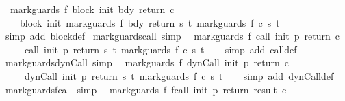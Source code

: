 \begin{isabellebody}
\ \ {\isachardoublequoteopen}mark{\isacharunderscore}guards\ f\ {\isacharparenleft}block\ init\ bdy\ return\ c{\isacharparenright}\ {\isacharequal}\isanewline
\ \ \ \ block\ init\ {\isacharparenleft}mark{\isacharunderscore}guards\ f\ bdy{\isacharparenright}\ return\ {\isacharparenleft}{\isasymlambda}s\ t{\isachardot}\ mark{\isacharunderscore}guards\ f\ {\isacharparenleft}c\ s\ t{\isacharparenright}{\isacharparenright}{\isachardoublequoteclose}\isanewline
%
\isadelimproof
\ \ %
\endisadelimproof
%
\isatagproof
{}\isamarkupfalse%
\ {\isacharparenleft}simp\ add{\isacharcolon}\ block{\isacharunderscore}def{\isacharparenright}%
\endisatagproof
{\isafoldproof}%
%
\isadelimproof
\isanewline
%
\endisadelimproof
\isanewline
{}\isamarkupfalse%
\ mark{\isacharunderscore}guards{\isacharunderscore}call\ {\isacharbrackleft}simp{\isacharbrackright}{\isacharcolon}\isanewline
\ \ {\isachardoublequoteopen}mark{\isacharunderscore}guards\ f\ {\isacharparenleft}call\ init\ p\ return\ c{\isacharparenright}\ {\isacharequal}\isanewline
\ \ \ \ \ call\ init\ p\ return\ {\isacharparenleft}{\isasymlambda}s\ t{\isachardot}\ mark{\isacharunderscore}guards\ f\ {\isacharparenleft}c\ s\ t{\isacharparenright}{\isacharparenright}{\isachardoublequoteclose}\isanewline
%
\isadelimproof
\ \ %
\endisadelimproof
%
\isatagproof
{}\isamarkupfalse%
\ {\isacharparenleft}simp\ add{\isacharcolon}\ call{\isacharunderscore}def{\isacharparenright}%
\endisatagproof
{\isafoldproof}%
%
\isadelimproof
\isanewline
%
\endisadelimproof
\isanewline
{}\isamarkupfalse%
\ mark{\isacharunderscore}guards{\isacharunderscore}dynCall\ {\isacharbrackleft}simp{\isacharbrackright}{\isacharcolon}\isanewline
\ \ {\isachardoublequoteopen}mark{\isacharunderscore}guards\ f\ {\isacharparenleft}dynCall\ init\ p\ return\ c{\isacharparenright}\ {\isacharequal}\isanewline
\ \ \ \ \ dynCall\ init\ p\ return\ {\isacharparenleft}{\isasymlambda}s\ t{\isachardot}\ mark{\isacharunderscore}guards\ f\ {\isacharparenleft}c\ s\ t{\isacharparenright}{\isacharparenright}{\isachardoublequoteclose}\isanewline
%
\isadelimproof
\ \ %
\endisadelimproof
%
\isatagproof
{}\isamarkupfalse%
\ {\isacharparenleft}simp\ add{\isacharcolon}\ dynCall{\isacharunderscore}def{\isacharparenright}%
\endisatagproof
{\isafoldproof}%
%
\isadelimproof
\isanewline
%
\endisadelimproof
\isanewline
{}\isamarkupfalse%
\ mark{\isacharunderscore}guards{\isacharunderscore}fcall\ {\isacharbrackleft}simp{\isacharbrackright}{\isacharcolon}\isanewline
\ \ {\isachardoublequoteopen}mark{\isacharunderscore}guards\ f\ {\isacharparenleft}fcall\ init\ p\ return\ result\ c{\isacharparenright}\ {\isacharequal}\isanewline

\end{isabellebody}
